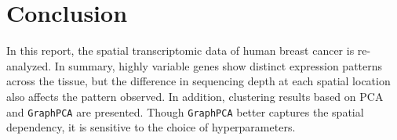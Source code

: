 \documentclass[11pt,oneside]{article}
\begin{document}
\section{Conclusion}

In this report, the spatial transcriptomic data of human breast cancer is re-analyzed. In summary, highly variable genes show distinct expression patterns across the tissue, but the difference in sequencing depth at each spatial location also affects the pattern observed. In addition, clustering results based on PCA and \texttt{GraphPCA} are presented. Though \texttt{GraphPCA} better captures the spatial dependency, it is sensitive to the choice of hyperparameters.
\end{document}
